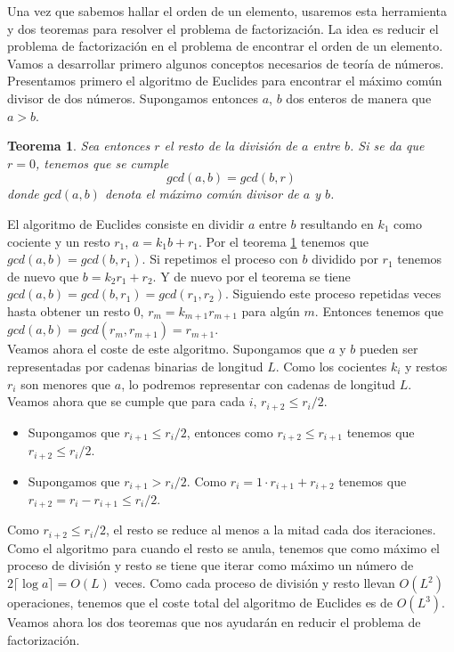 \documentclass[a4paper]{article}
\newtheorem{teo}{Teorema}[section]
\numberwithin{equation}{section}
\newcommand{\modd}{\; mod \;}
\begin{document}
Una vez que sabemos hallar el orden de un elemento, usaremos esta herramienta y dos teoremas para resolver el problema de factorización. La idea es reducir el problema de factorización en el problema de encontrar el orden de un elemento. Vamos a desarrollar primero algunos conceptos necesarios de teoría de números.\\
\linebreak
Presentamos primero el algoritmo de Euclides para encontrar el máximo común divisor de dos números. Supongamos entonces $a$, $b$ dos enteros de manera que $a > b$.
\begin{teo} \label{teoEu}
Sea entonces $r$ el resto de la división de $a$ entre $b$. Si se da que $r=0$, tenemos que se cumple
\begin{equation}
gcd(a,b) = gcd(b,r)
\end{equation}
donde $gcd(a,b)$ denota el máximo común divisor de $a$ y $b$.
\end{teo}
El algoritmo de Euclides consiste en dividir $a$ entre $b$ resultando en $k_1$ como cociente y un resto $r_1$, $a=k_1 b + r_1$. Por el teorema \ref{teoEu} tenemos que $gcd(a,b) = gcd(b,r_1)$. Si repetimos el proceso con $b$ dividido por $r_1$ tenemos de nuevo que $b = k_2 r_1 + r_2$. Y de nuevo por el teorema se tiene $gcd(a,b) = gcd(b,r_1) = gcd(r_1, r_2)$. Siguiendo este proceso repetidas veces hasta obtener un resto $0$, $r_m = k_{m+1}r_{m+1}$ para algún $m$. Entonces tenemos que $gcd(a, b) = gcd(r_m, r_{m+1}) = r_{m+1}$.\\
\linebreak
Veamos ahora el coste de este algoritmo. Supongamos que $a$ y $b$ pueden ser representadas por cadenas binarias de longitud $L$. Como los cocientes $k_i$ y restos $r_i$ son menores que $a$, lo podremos representar con cadenas de longitud $L$. Veamos ahora que se cumple que para cada $i$, $r_{i+2} \leq r_i /2$.
\begin{itemize}
\item Supongamos que $r_{i+1} \leq r_i/2$, entonces como $r_{i+2} \leq r_{i+1}$ tenemos que $r_{i+2} \leq r_i /2$.

\item Supongamos que $r_{i+1} > r_i/2$. Como $r_i = 1\cdot r_{i+1} + r_{i+2}$ tenemos que $r_{i+2} = r_i - r_{i+1} \leq r_i/2$.

\end{itemize}
Como $r_{i+2} \leq r_i/2$, el resto se reduce al menos a la mitad cada dos iteraciones. Como el algoritmo para cuando el resto se anula, tenemos que como máximo el proceso de división y resto se tiene que iterar como máximo un número de $2\lceil \log a \rceil = O(L)$ veces. Como cada proceso de división y resto llevan $O(L^2)$ operaciones, tenemos que el coste total del algoritmo de Euclides es de $O(L^3)$.\\
\linebreak
Veamos ahora los dos teoremas que nos ayudarán en reducir el problema de factorización.
\end{document}
